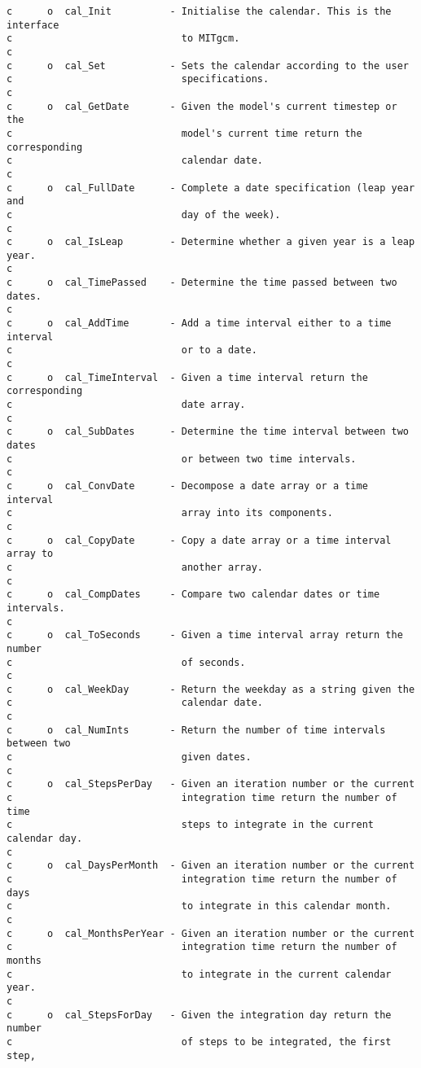 {\footnotesize
\begin{verbatim}
c      o  cal_Init          - Initialise the calendar. This is the interface
c                             to MITgcm.
c
c      o  cal_Set           - Sets the calendar according to the user
c                             specifications.
c
c      o  cal_GetDate       - Given the model's current timestep or the
c                             model's current time return the corresponding
c                             calendar date.
c
c      o  cal_FullDate      - Complete a date specification (leap year and
c                             day of the week).
c
c      o  cal_IsLeap        - Determine whether a given year is a leap year.
c
c      o  cal_TimePassed    - Determine the time passed between two dates.
c
c      o  cal_AddTime       - Add a time interval either to a time interval
c                             or to a date.
c
c      o  cal_TimeInterval  - Given a time interval return the corresponding
c                             date array.
c
c      o  cal_SubDates      - Determine the time interval between two dates
c                             or between two time intervals.
c
c      o  cal_ConvDate      - Decompose a date array or a time interval
c                             array into its components.
c
c      o  cal_CopyDate      - Copy a date array or a time interval array to
c                             another array.
c
c      o  cal_CompDates     - Compare two calendar dates or time intervals. 
c
c      o  cal_ToSeconds     - Given a time interval array return the number
c                             of seconds.
c
c      o  cal_WeekDay       - Return the weekday as a string given the
c                             calendar date.
c
c      o  cal_NumInts       - Return the number of time intervals between two
c                             given dates.
c
c      o  cal_StepsPerDay   - Given an iteration number or the current
c                             integration time return the number of time
c                             steps to integrate in the current calendar day.
c
c      o  cal_DaysPerMonth  - Given an iteration number or the current
c                             integration time return the number of days
c                             to integrate in this calendar month.
c
c      o  cal_MonthsPerYear - Given an iteration number or the current
c                             integration time return the number of months
c                             to integrate in the current calendar year.
c
c      o  cal_StepsForDay   - Given the integration day return the number
c                             of steps to be integrated, the first step,

\end{verbatim}}
